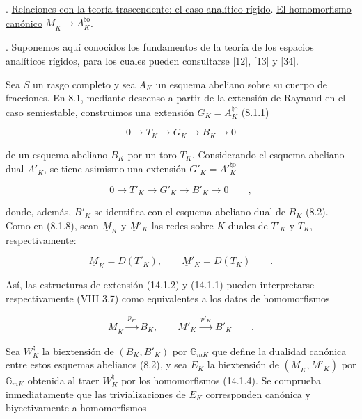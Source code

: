 \par\medskip
{}. \underline{Relaciones con la teoría trascendente: el caso
analítico rígido}. \underline{El homomorfismo canónico}
$\underline M_K\longrightarrow A_K^{\natural\mathrm o}$.

\medskip
{}. Suponemos aquí conocidos los fundamentos de la teoría de los
espacios analíticos rígidos, para los cuales pueden consultarse [12],
[13] y [34].

Sea $S$ un rasgo completo y sea $A_K$ un esquema abeliano sobre su
cuerpo de fracciones. En 8.1, mediante descenso a partir de la extensión
de Raynaud en el caso semiestable, construimos una extensión
$G_K=A_K^{\natural\mathrm o}$ (8.1.1)

\begin{equation}\tag{14.1.1}
 0\longrightarrow T_K\longrightarrow G_K\longrightarrow B_K
 \longrightarrow0
\end{equation}

\noindent
de un esquema abeliano $B_K$ por un toro $T_K$. Considerando el esquema
abeliano dual $A'_K$, se tiene asimismo una extensión
$G'_K=A'{}^{\natural\mathrm o}_K$

\begin{equation}\tag{14.1.2}
 0\longrightarrow T'_K\longrightarrow G'_K\longrightarrow B'_K
 \longrightarrow0\qquad ,
\end{equation}

\noindent
donde, además, $B'_K$ se identifica con el esquema abeliano dual de
$B_K$ (8.2). Como en (8.1.8), sean $\underline M_K$ y
$\underline M'_K$ las redes sobre $K$ duales de $T'_K$ y $T_K$,
respectivamente:

\begin{equation}\tag{14.1.3}
 \underline M_K=D(T'_K),\qquad \underline M'_K=D(T_K)\qquad .
\end{equation}

\noindent
Así, las estructuras de extensión (14.1.2) y (14.1.1) pueden
interpretarse respectivamente (VIII 3.7) como equivalentes a los datos
de homomorfismos

\begin{equation}\tag{14.1.4}
 \underline M_K\xrightarrow{\ p_K\ }B_K,\qquad
 \underline M'_K\xrightarrow{\ p'_K\ }B'_K\qquad .
\end{equation}

Sea $W_K^{\natural}$ la biextensión de $(B_K,B'_K)$ por
$\mathbb G_{mK}$ que define la dualidad canónica entre estos esquemas
abelianos (8.2), y sea $E_K$ la biextensión de
$(\underline M_K,\underline M'_K)$ por $\mathbb G_{mK}$ obtenida al
traer $W_K^{\natural}$ por los homomorfismos (14.1.4). Se comprueba
inmediatamente que las trivializaciones de $E_K$ corresponden
canónica y biyectivamente a homomorfismos

